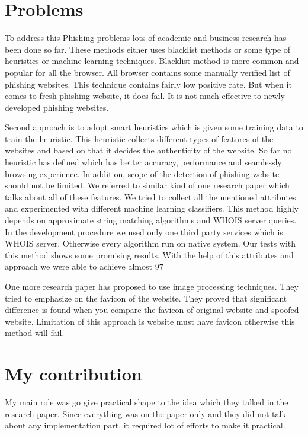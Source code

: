 \section{Problems}

To address this Phishing problems lots of academic and business research has been done so far. These methods either uses blacklist methods or some type of heuristics or machine learning techniques. Blacklist method is more common and popular for all the browser. All browser contains some manually verified list of phishing websites. This technique contains fairly low positive rate. But when it comes to fresh phishing website, it does fail. It is not much effective to newly developed phishing websites.

Second approach is to adopt smart heuristics which is given some training data to train the heuristic. This heuristic collects different types of features of the websites and based on that it decides the authenticity of the website. So far no heuristic has defined which has better accuracy, performance and seamlessly browsing experience. In addition, scope of the detection of phishing website should not be limited. We referred to similar kind of one research paper which talks about all of these features. We tried to collect all the mentioned attributes and experimented with different machine learning classifiers. This method highly depends on approximate string matching algorithms and WHOIS server queries. In the development procedure we used only one third party services which is WHOIS server. Otherwise every algorithm run on native system. Our tests with this method shows some promising results. With the help of this attributes and approach we were able to achieve almost 97%

One more research paper has proposed to use image processing techniques. They tried to emphasize on the favicon of the website. They proved that significant difference is found when you compare the favicon of original website and spoofed website. Limitation of this approach is website must have favicon otherwise this method will fail. 


\section{My contribution}

My main role was go give practical shape to the idea which they talked in the research paper. Since everything was on the paper only and they did not talk about any implementation part, it required lot of efforts to make it practical. 


